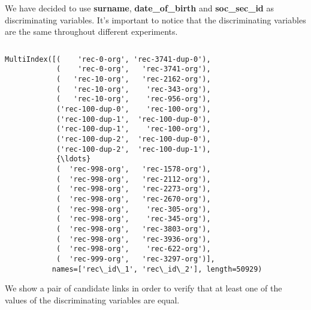 \documentclass{article}
\begin{document}
We have decided to use \textbf{surname}, \textbf{date\_of\_birth} and
\textbf{soc\_sec\_id} as discriminating variables. It's important to
notice that the discriminating variables are the same throughout
different experiments.

    \begin{Verbatim}[commandchars=\\\{\}]

\end{Verbatim}
\begin{Verbatim}[commandchars=\\\{\}]
MultiIndex([(    'rec-0-org', 'rec-3741-dup-0'),
            (    'rec-0-org',   'rec-3741-org'),
            (   'rec-10-org',   'rec-2162-org'),
            (   'rec-10-org',    'rec-343-org'),
            (   'rec-10-org',    'rec-956-org'),
            ('rec-100-dup-0',    'rec-100-org'),
            ('rec-100-dup-1',  'rec-100-dup-0'),
            ('rec-100-dup-1',    'rec-100-org'),
            ('rec-100-dup-2',  'rec-100-dup-0'),
            ('rec-100-dup-2',  'rec-100-dup-1'),
            {\ldots}
            (  'rec-998-org',   'rec-1578-org'),
            (  'rec-998-org',   'rec-2112-org'),
            (  'rec-998-org',   'rec-2273-org'),
            (  'rec-998-org',   'rec-2670-org'),
            (  'rec-998-org',    'rec-305-org'),
            (  'rec-998-org',    'rec-345-org'),
            (  'rec-998-org',   'rec-3803-org'),
            (  'rec-998-org',   'rec-3936-org'),
            (  'rec-998-org',    'rec-622-org'),
            (  'rec-999-org',   'rec-3297-org')],
           names=['rec\_id\_1', 'rec\_id\_2'], length=50929)
\end{Verbatim}
    We show a pair of candidate links in order to verify that at least one
of the values of the discriminating variables are equal.
\end{document}

